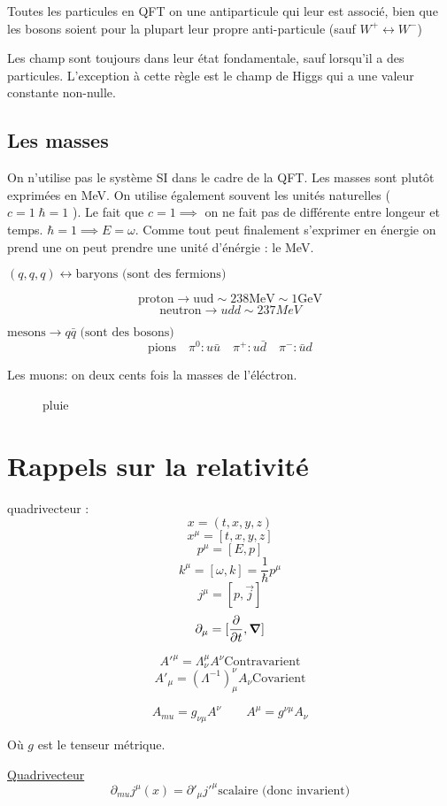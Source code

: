 Toutes les particules en QFT on une antiparticule qui leur est associé, bien que les bosons soient pour la plupart leur propre anti-particule (sauf $W^{+}\leftrightarrow W^{-}$)


Les champ sont toujours dans leur état fondamentale, sauf lorsqu'il a des particules. L'exception à cette règle est le champ de Higgs qui a une valeur constante non-nulle.



\subsection*{Les masses}


\begin{tcolorbox}[title=Remarque (unitées)]
    On n'utilise pas le système SI dans le cadre de la QFT. Les masses sont plutôt exprimées en MeV. On utilise également souvent les unités naturelles ( $c =1\; \hbar =1$  ).
Le fait que $c=1 \implies$ on ne fait pas de différente entre longeur et temps. $\hbar =1 \implies E = \omega$. Comme tout peut finalement s'exprimer en énergie on prend une on peut prendre une unité d'énérgie : le MeV.
     
\end{tcolorbox}


$(q,q,q) \leftrightarrow \text{baryons (sont des fermions)} $ 

$$\text{proton} \rightarrow \text{uud} \sim 238 \text{MeV} \sim 1 \text{GeV}    $$ 
$$\text{neutron} \rightarrow udd \sim 237 MeV$$ 

$\text{mesons} \rightarrow q\bar q \text{ (sont des bosons) }  $ 
$$\text{pions}\quad \pi^{0}: u\bar u \quad \pi^{+}: u\bar d \quad \pi^{-}:\bar u d $$ 

Les muons: on deux cents fois la masses de l'éléctron. 

\begin{figure}[ht]
    \centering
    \caption{pluie}
    \label{fig:pluie}
\end{figure}

\section*{Rappels sur la relativité}

quadrivecteur : $$x = (t,x,y,z)$$ 
$$x^{\mu}= [t,x,y,z]$$ 
$$p^{\mu}= [E,p]$$ 
$$k^{\mu}=[\omega, k] = \frac{1}{\hbar} p^\mu$$ 
$$j^{\mu}= [p, \vec j] $$ 
$$\partial_{\mu} = [\pdv{t}, \grad] $$  

$$A'^\mu = \Lambda^\mu_{\nu} A^{\nu} \text{Contravarient} $$ 
$$A'_\mu = (\Lambda^{-1})^\nu_{\mu} A_{\nu} \text{Covarient} $$ 

$$A_{mu} = g_{\nu\mu} A^{\nu} \quad\quad A^{\mu} =g^{\nu\mu}A_\nu$$ 


Où $g$ est le tenseur métrique.

\underline{Quadrivecteur}
$$\partial_{mu} j^{\mu}(x) = \partial'_\mu j'^\mu \text{scalaire (donc invarient)}  $$ 




